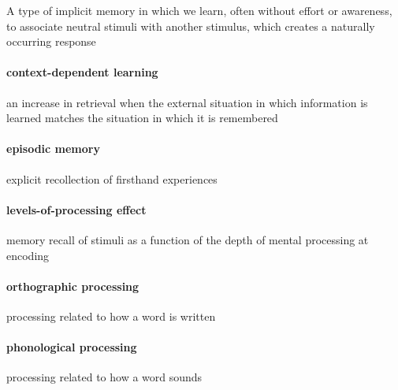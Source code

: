 \documentclass[
]{krantz}
\begin{document}
A type of implicit memory in which we learn, often without effort or awareness, to associate neutral stimuli with another stimulus, which creates a naturally occurring response

\hypertarget{context-dependent-learning}{%
\paragraph*{context-dependent learning}\label{context-dependent-learning}}

an increase in retrieval when the external situation in which information is learned matches the situation in which it is remembered

\hypertarget{episodic-memory}{%
\paragraph*{episodic memory}\label{episodic-memory}}

explicit recollection of firsthand experiences

\hypertarget{levels-of-processing-effect}{%
\paragraph*{levels-of-processing effect}\label{levels-of-processing-effect}}

memory recall of stimuli as a function of the depth of mental processing at encoding

\hypertarget{orthographic-processing}{%
\paragraph*{orthographic processing}\label{orthographic-processing}}

processing related to how a word is written

\hypertarget{phonological-processing}{%
\paragraph*{phonological processing}\label{phonological-processing}}

processing related to how a word sounds
\end{document}
